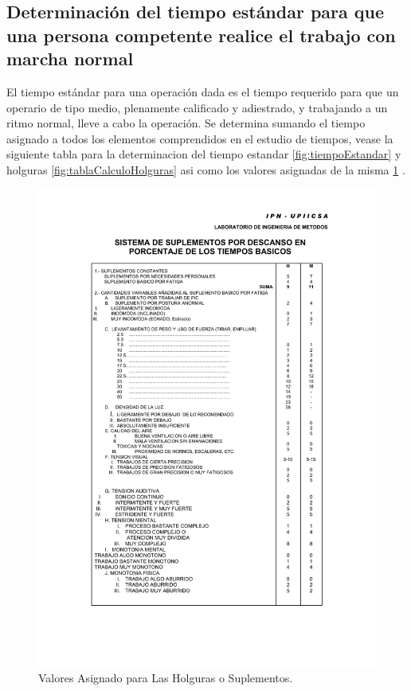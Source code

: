     \subsection{Determinación del tiempo estándar para que una persona competente realice el trabajo con marcha normal}
    
      El tiempo estándar para una operación dada es el tiempo requerido para que un operario de tipo medio, plenamente calificado y adiestrado, y trabajando a un ritmo normal, lleve a cabo la operación. Se determina sumando el tiempo asignado a todos los elementos comprendidos en el estudio de tiempos, vease la siguiente tabla para la determinacion del tiempo estandar \ref{fig:tiempoEstandar} y holguras \ref{fig:tablaCalculoHolguras} asi como los valores asignadas de la misma  \ref{fig:holguras} .
    
    \begin{figure}[H]
        \centering
        \includegraphics[scale=0.4]{15/img/tablaHolguras.pdf}
        \caption{Valores Asignado para Las Holguras o Suplementos.}
        \label{fig:holguras}
    \end{figure}
    
